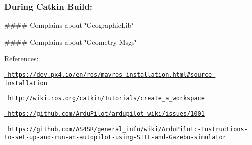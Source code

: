 \subsubsection*{During Catkin Build\+:}

\#\#\#\# Complains about \char`\"{}\+Geographic\+Lib\char`\"{} 
\begin{DoxyCode}{0}
\end{DoxyCode}


\#\#\#\# Complains about \char`\"{}\+Geometry Msgs\char`\"{} 
\begin{DoxyCode}{0}
\end{DoxyCode}


\DoxyHorRuler


References\+:
\begin{DoxyItemize}
\item \href{https://dev.px4.io/en/ros/mavros_installation.html\#source-installation}{\texttt{ https\+://dev.\+px4.\+io/en/ros/mavros\+\_\+installation.\+html\#source-\/installation}}
\item \href{http://wiki.ros.org/catkin/Tutorials/create_a_workspace}{\texttt{ http\+://wiki.\+ros.\+org/catkin/\+Tutorials/create\+\_\+a\+\_\+workspace}}
\item \href{https://github.com/ArduPilot/ardupilot_wiki/issues/1001}{\texttt{ https\+://github.\+com/\+Ardu\+Pilot/ardupilot\+\_\+wiki/issues/1001}}
\item \href{https://github.com/AS4SR/general_info/wiki/ArduPilot:-Instructions-to-set-up-and-run-an-autopilot-using-SITL-and-Gazebo-simulator}{\texttt{ https\+://github.\+com/\+A\+S4\+S\+R/general\+\_\+info/wiki/\+Ardu\+Pilot\+:-\/\+Instructions-\/to-\/set-\/up-\/and-\/run-\/an-\/autopilot-\/using-\/\+S\+I\+T\+L-\/and-\/\+Gazebo-\/simulator}} 
\end{DoxyItemize}